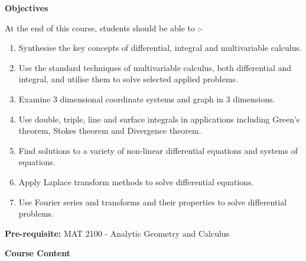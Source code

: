 \documentclass[11pt,a4paper]{article}
\theoremstyle{definition}
\begin{document}
\textbf{Objectives}


At the end of this course, students should be able to :-
\begin{enumerate}
\item Synthesise the key concepts of differential, integral and multivariable calculus.
\item Use the standard techniques of multivariable calculus, both differential and integral, and utilise them to solve selected applied problems.
\item Examine 3 dimensional coordinate systems and graph in 3 dimensions.
\item Use double, triple, line and surface integrals in applications including Green's theorem, Stokes theorem and Divergence theorem.
\item Find solutions to a variety of non-linear differential equations and systems of equations.
\item Apply Laplace transform methods to solve differential equations.
\item Use Fourier series and transforms and their properties to solve differential problems.
\end{enumerate}

\textbf{Pre-requisite:} MAT 2100 - Analytic Geometry and Calculus


\textbf{Course Content}
\end{document}
